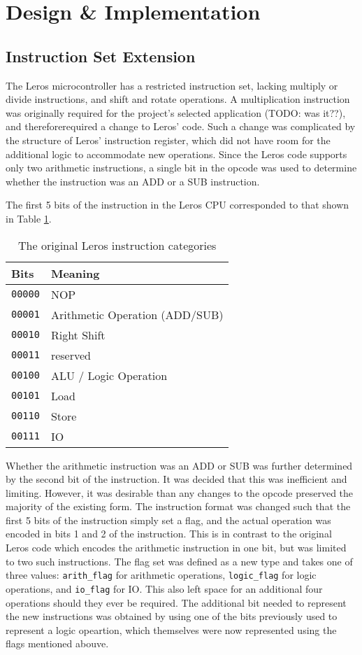 \section{Design \& Implementation}
\subsection{Instruction Set Extension}
The Leros microcontroller has a restricted instruction set, lacking multiply
or divide instructions, and shift and rotate operations. A multiplication
instruction was originally required for the
project's selected application (TODO: was it??), and thereforerequired a
change to Leros' code. Such a change was complicated by the structure of
Leros' instruction
register, which did not have room for the additional logic to accommodate
new
operations. Since the Leros code supports only two arithmetic instructions,
a single bit in the opcode was used to determine whether the instruction
was an ADD or a SUB instruction.

The first 5 bits of the instruction in the Leros CPU
corresponded to that shown
in Table \ref{tab:original-instruction}.

\begin{table}
\centering
\caption{The original Leros instruction categories}
\label{tab:original-instruction}
\begin{tabular}{|l|l|}
\hline
\textbf{Bits} & Meaning \\
\hline
\texttt{00000} & NOP \\
\texttt{00001} & Arithmetic Operation (ADD/SUB) \\
\texttt{00010} & Right Shift \\
\texttt{00011} & reserved \\
\texttt{00100} & ALU / Logic Operation \\
\texttt{00101} & Load \\
\texttt{00110} & Store \\
\texttt{00111} & IO \\
\hline
\end{tabular}
\end{table}

Whether the arithmetic instruction was an ADD or SUB was further determined by
the second bit of the instruction. It was decided that this was inefficient and
limiting. However, it was desirable than any changes to the opcode preserved the
majority of the existing form. The instruction format was changed such that the
first 5 bits of the instruction simply set a flag, and the actual operation was
encoded in bits 1 and 2 of the instruction. This is in contrast to the original
Leros code which encodes the arithmetic instruction in one bit, but was limited
to two such instructions. The flag set was defined as a new type and takes one
of three values: \texttt{arith\_flag} for arithmetic operations,
\texttt{logic\_flag} for logic operations, and  \texttt{io\_flag} for IO. This
also left space for an additional four operations should they ever be required.
The additional bit needed to represent the new instructions was obtained by using
one of the bits previously used to represent a logic opeartion, which themselves
were now represented using the flags mentioned abouve.

